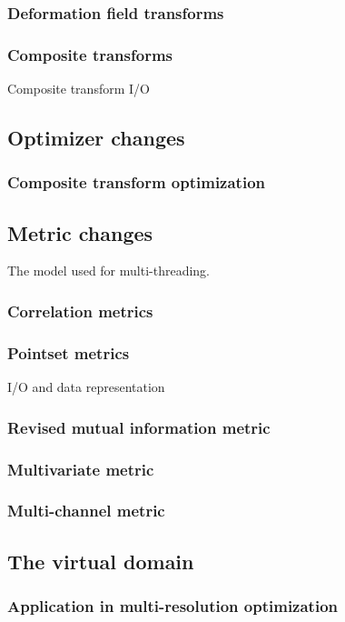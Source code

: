 \documentclass{llncs}
\begin{document}
\subsubsection{Deformation field transforms}
\subsubsection{Composite transforms}
Composite transform I/O

\subsection{Optimizer changes}
\subsubsection{Composite transform optimization}

\subsection{Metric changes}
The model used for multi-threading. 
\subsubsection{Correlation metrics}
\subsubsection{Pointset metrics}
I/O and data representation
\subsubsection{Revised mutual information metric}
\subsubsection{Multivariate metric}
\subsubsection{Multi-channel metric}

\subsection{The virtual domain}
\subsubsection{Application in multi-resolution optimization}
\end{document}
